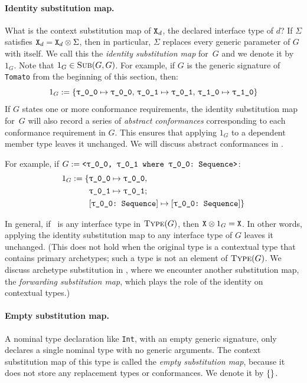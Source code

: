 \documentclass[../generics]{subfiles}
\begin{document}
\paragraph{Identity substitution map.}
What is the context substitution map of $\texttt{X}_d$, the declared interface type of $d$? If $\Sigma$ satisfies $\texttt{X}_d = \texttt{X}_d \otimes \Sigma$, then in particular, $\Sigma$ replaces every generic parameter of $G$ with itself. We call this the \emph{identity substitution map} for~$G$ and we denote it by~$1_G$. Note that $1_G \in \textsc{Sub}({G, G})$. For example, if $G$ is the generic signature of \texttt{Tomato} from the beginning of this section, then:
\[
1_G := \SubstMap{\SubstType{\rT}{\rT},\,\SubstType{\rU}{\rU},\,\SubstType{\ttgp{1}{0}}{\ttgp{1}{0}}}
\]
If $G$ states one or more conformance requirements, the identity substitution map for~$G$ will also record a series of \emph{abstract conformances} corresponding to each conformance requirement in $G$. This ensures that applying $1_G$ to a dependent member type leaves it unchanged. We will discuss abstract conformances in .

For example, if $G := \texttt{<\rT, \rU\ where \rT:~Sequence>}$:
\begin{align*}
1_G := \SubstMapC{&\SubstType{\rT}{\rT},\\
&\SubstType{\rU}{\rU}}{\\
&\SubstConf{\rT}{\rT}{Sequence}}
\end{align*}

In general, if \tX\ is any interface type in $\textsc{Type}({G})$, then $\texttt{X} \otimes 1_G = \texttt{X}$. In other words, applying the identity substitution map to any interface type of $G$ leaves it unchanged. (This does not hold when the original type is a contextual type that contains primary archetypes; such a type is not an element of $\textsc{Type}({G})$. We discuss archetype substitution in , where we encounter another substitution map, the \emph{forwarding substitution map}, which plays the role of the identity on contextual types.)

\paragraph{Empty substitution map.}
A nominal type declaration like \texttt{Int}, with an empty generic signature, only declares a single nominal type with no generic arguments. The context substitution map of this type is called the \emph{empty substitution map}, because it does not store any replacement types or conformances. We denote it by $\{\}$.
\end{document}
